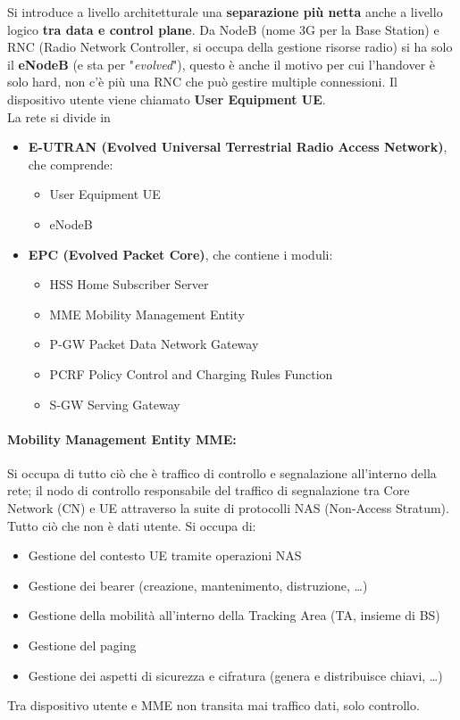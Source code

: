 Si introduce a livello architetturale una \textbf{separazione più netta} anche a livello logico \textbf{tra data e control plane}. Da NodeB (nome 3G per la Base Station) e RNC (Radio Network Controller, si occupa della gestione risorse radio) si ha solo il \textbf{eNodeB} (e sta per "\textit{evolved}"), questo è anche il motivo per cui l'handover è solo hard, non c'è più una RNC che può gestire multiple connessioni. Il dispositivo utente viene chiamato \textbf{User Equipment UE}.\\

La rete si divide in 
\begin{itemize}
	\item \textbf{E-UTRAN (Evolved Universal Terrestrial Radio Access Network)}, che comprende: 
	\begin{itemize}
		\item User Equipment UE
		\item eNodeB
	\end{itemize}
	\item \textbf{EPC (Evolved Packet Core)}, che contiene i moduli: 
	\begin{itemize}
		\item HSS Home Subscriber Server
		\item MME Mobility Management Entity
		\item P-GW Packet Data Network Gateway
		\item PCRF Policy Control and Charging Rules Function
		\item S-GW Serving Gateway
	\end{itemize}
\end{itemize}

\paragraph{Mobility Management Entity MME:} Si occupa di tutto ciò che è traffico di controllo e segnalazione all'interno della rete; il nodo di controllo responsabile del traffico di segnalazione tra Core Network (CN) e UE attraverso la suite di protocolli NAS (Non-Access Stratum). Tutto ciò che non è dati utente. Si occupa di: 
\begin{itemize}
	\item Gestione del contesto UE tramite operazioni NAS
	\item Gestione dei bearer (creazione, mantenimento, distruzione, \dots)
	\item Gestione della mobilità all'interno della Tracking Area (TA, insieme di BS)
	\item Gestione del paging
	\item Gestione dei aspetti di sicurezza e cifratura (genera e distribuisce chiavi, \dots)
\end{itemize}
Tra dispositivo utente e MME non transita mai traffico dati, solo controllo.\\

